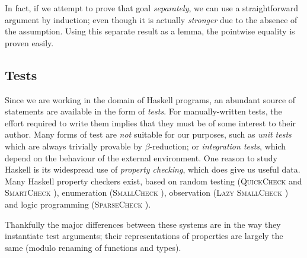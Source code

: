\documentclass[]{article}
\begin{document}
In fact, if we attempt to prove that goal \emph{separately}, we can use a straightforward argument by induction; even though it is actually \emph{stronger} due to the absence of the  assumption. Using this separate result as a lemma, the pointwise equality is proven easily.

\iffalse

\begin{lstlisting}[language=ML, xleftmargin=.2\textwidth, xrightmargin=.2\textwidth]
Lemma gen n m : plus (S n) m = plus n (S m).
  induction n; triv. (* Base case is trivial *)

  (* Move all S constructors outside *)
  simpl. rewrite <- IHn. simpl.

  (* Trivial *)
  reflexivity.
Defined.
\end{lstlisting}

\begin{lstlisting}[language=ML, xleftmargin=.2\textwidth, xrightmargin=.2\textwidth]
  rewrite (gen n m).
  reflexivity.
Defined.
\end{lstlisting}

\fi

\subsection{Tests} \label{tests}

Since we are working in the domain of Haskell programs, an abundant source of statements are available in the form of \emph{tests}. For manually-written tests, the effort required to write them implies that they must be of some interest to their author. Many forms of test are \emph{not} suitable for our purposes, such as \emph{unit tests} which are always trivially provable by $\beta$-reduction; or \emph{integration tests}, which depend on the behaviour of the external environment. One reason to study Haskell is its widespread use of \emph{property checking}, which does give us useful data. Many Haskell property checkers exist, based on random testing (\textsc{QuickCheck} \cite{claessen2011quickcheck} and \textsc{SmartCheck} \cite{pike2014smartcheck}), enumeration (\textsc{SmallCheck} \cite{runciman2008smallcheck}), observation (\textsc{Lazy SmallCheck} \cite{reich2013advances}) and logic programming (\textsc{SparseCheck} \cite{sparsecheck}).

Thankfully the major differences between these systems are in the way they instantiate test arguments; their representations of properties are largely the same (modulo renaming of functions and types).
\end{document}
